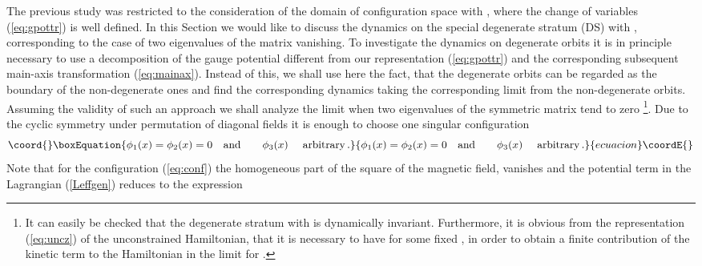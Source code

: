 \documentclass[a4paper,12pt]{article}
\begin{document}


The previous study  was restricted to the
consideration of the domain of configuration space with \coordHE{},
where the change of variables (\ref{eq:gpottr}) is well defined.
In this Section we would like to discuss the dynamics on
the special degenerate stratum (DS) with \coordHE{},
corresponding to the case of two eigenvalues of the matrix \coordHE{} vanishing.
To investigate the dynamics on degenerate orbits it is in principle
necessary to use a decomposition of the gauge potential
different from our representation (\ref{eq:gpottr})
and the corresponding subsequent main-axis transformation (\ref{eq:mainax}).
Instead of this, we shall use here the fact, that the
degenerate orbits can be regarded as the boundary of the non-degenerate ones
and find the corresponding dynamics taking the corresponding limit from
the non-degenerate orbits.
Assuming the validity of such an approach
we shall analyze the limit when
two eigenvalues of the symmetric matrix \coordHE{}  tend to zero
\footnote{
It can easily be checked that the degenerate stratum with
\coordHE{} is dynamically invariant.
Furthermore, it is obvious from the representation
(\ref{eq:uncz}) of the unconstrained Hamiltonian, that it is necessary to have
\coordHE{} for some fixed \coordHE{},
in order to obtain a finite contribution of the
kinetic term to the Hamiltonian in the limit
\coordHE{} for \coordHE{}.}.
Due to the cyclic symmetry under permutation of diagonal fields
it is enough to choose one  singular configuration
\begin{equation}\coord{}\boxEquation{
\label{eq:conf}
\phi_1(x) = \phi_2(x) = 0\ \ \ {\rm and} \qquad \phi_3(x)
\ \quad {\rm arbitrary}\,.
}{
\phi_1(x) = \phi_2(x) = 0\ \ \ {\rm and} \qquad \phi_3(x)
\ \quad {\rm arbitrary}\,.
}{ecuacion}\coordE{}\end{equation}
Note that for the configuration (\ref{eq:conf}) the homogeneous part of the
square of the magnetic field, vanishes and the potential term in the
Lagrangian (\ref{Leffgen}) reduces to the expression
\end{document}
